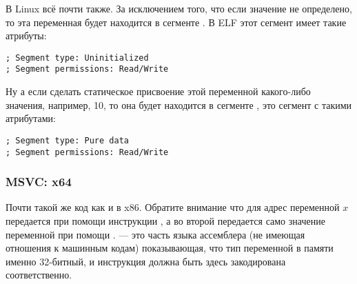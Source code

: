В Linux всё почти также. За исключением того, что если значение  не определено, 
то эта переменная будет находится в сегменте .
В \ac{ELF} этот сегмент имеет такие атрибуты:

\begin{lstlisting}
; Segment type: Uninitialized
; Segment permissions: Read/Write
\end{lstlisting}

Ну а если сделать статическое присвоение этой переменной какого-либо
значения, например, 10, то она будет находится 
в сегменте ,
это сегмент с такими атрибутами:

\begin{lstlisting}
; Segment type: Pure data
; Segment permissions: Read/Write
\end{lstlisting}

\subsubsection{MSVC: x64}



Почти такой же код как и в x86.
Обратите внимание что для  адрес переменной $x$ передается
при помощи инструкции \LEA, а во второй \printf передается само значение переменной при помощи \MOV.
 --- это часть языка ассемблера (не имеющая отношения к машинным кодам) показывающая, что тип переменной в памяти именно 32-битный, 
и инструкция \MOV должна быть здесь закодирована соответственно.

